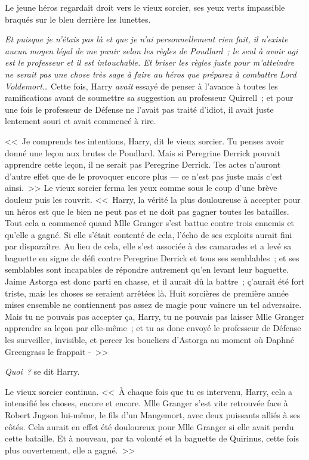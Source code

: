 Le jeune héros regardait droit vers le vieux sorcier, ses yeux verts impassible braqués sur le bleu derrière les lunettes.

\emph{Et puisque je n'étais pas là et que je n'ai personnellement rien fait, il n'existe aucun moyen légal de me punir selon les règles de Poudlard~; le seul à avoir agi est le professeur et il est intouchable. Et briser les règles juste pour m'atteindre ne serait pas une chose très sage à faire au héros que préparez à combattre Lord Voldemort…} Cette fois, Harry \emph{avait} essayé de penser à l'avance à toutes les ramifications avant de soumettre sa suggestion au professeur Quirrell~; et pour une fois le professeur de Défense ne l'avait pas traité d'idiot, il avait juste lentement souri et avait commencé à rire.

<<~Je comprends tes intentions, Harry, dit le vieux sorcier. Tu penses avoir donné une leçon aux brutes de Poudlard. Mais si Peregrine Derrick pouvait apprendre cette leçon, il ne serait pas Peregrine Derrick. Tes actes n'auront d'autre effet que de le provoquer encore plus — ce n'est pas juste mais c'est ainsi.~>> Le vieux sorcier ferma les yeux comme sous le coup d'une brève douleur puis les rouvrit. <<~Harry, la vérité la plus douloureuse à accepter pour un héros est que le bien ne peut pas et ne doit pas gagner toutes les batailles. Tout cela a commencé quand Mlle Granger s'est battue contre trois ennemis et qu'elle a gagné. Si elle s'était contenté de cela, l'écho de ses exploits aurait fini par disparaître. Au lieu de cela, elle s'est associée à des camarades et a levé sa baguette en signe de défi contre Peregrine Derrick et tous ses semblables~; et ses semblables sont incapables de répondre autrement qu'en levant leur baguette. Jaime Astorga est donc parti en chasse, et il aurait dû la battre~; ç'aurait été fort triste, mais les choses se seraient arrêtées là. Huit sorcières de première année mises ensemble ne contiennent pas assez de magie pour vaincre un tel adversaire. Mais tu ne pouvais pas accepter ça, Harry, tu ne pouvais pas laisser Mlle Granger apprendre sa leçon par elle-même~; et tu as donc envoyé le professeur de Défense les surveiller, invisible, et percer les boucliers d'Astorga au moment où Daphné Greengrass le frappait -~>>

\emph{Quoi~?} se dit Harry.

Le vieux sorcier continua. <<~À chaque fois que tu es intervenu, Harry, cela a intensifié les choses, encore et encore. Mlle Granger s'est vite retrouvée face à Robert Jugson lui-même, le fils d'un Mangemort, avec deux puissants alliés à ses côtés. Cela aurait en effet été douloureux pour Mlle Granger si elle avait perdu cette bataille. Et à nouveau, par ta volonté et la baguette de Quirinus, cette fois plus ouvertement, elle a gagné.~>>

